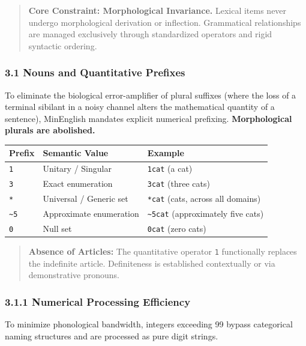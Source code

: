 \begin{quote}
\textbf{Core Constraint: Morphological Invariance.} Lexical items never
undergo morphological derivation or inflection. Grammatical
relationships are managed exclusively through standardized operators and
rigid syntactic ordering.
\end{quote}

\subsubsection{3.1 Nouns and Quantitative
Prefixes}\label{nouns-and-quantitative-prefixes}

To eliminate the biological error-amplifier of plural suffixes (where
the loss of a terminal sibilant in a noisy channel alters the
mathematical quantity of a sentence), MinEnglish mandates explicit
numerical prefixing. \textbf{Morphological plurals are abolished.}

{\def\LTcaptype{} %
\begin{longtable}[]{@{}lll@{}}
\toprule\noalign{}
Prefix & Semantic Value & Example \\
\midrule\noalign{}
\endhead
\bottomrule\noalign{}
\endlastfoot
\texttt{1} & Unitary / Singular & \texttt{1cat} (a cat) \\
\texttt{3} & Exact enumeration & \texttt{3cat} (three cats) \\
\texttt{*} & Universal / Generic set & \texttt{*cat} (cats, across all
domains) \\
\texttt{\textasciitilde{}5} & Approximate enumeration &
\texttt{\textasciitilde{}5cat} (approximately five cats) \\
\texttt{0} & Null set & \texttt{0cat} (zero cats) \\
\end{longtable}
}

\begin{quote}
\textbf{Absence of Articles:} The quantitative operator \texttt{1}
functionally replaces the indefinite article. Definiteness is
established contextually or via demonstrative pronouns.
\end{quote}

\subsubsection{3.1.1 Numerical Processing
Efficiency}\label{numerical-processing-efficiency}

To minimize phonological bandwidth, integers exceeding 99 bypass
categorical naming structures and are processed as pure digit strings.

